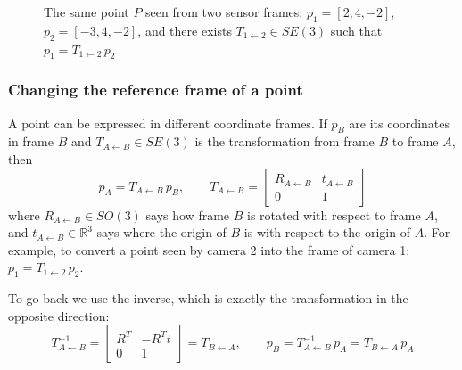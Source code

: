 \begin{figure}[H]
    \centering
    \caption{The same point $P$ seen from two sensor frames: $p_1 = [2, 4, -2]$, $p_2 = [-3, 4, -2]$, and there exists $T_{1\leftarrow2} \in SE(3)$ such that $p_1 = T_{1\leftarrow2}\,p_2$}
\end{figure}

\subsubsection{Changing the reference frame of a point}
A point can be expressed in different coordinate frames. If $p_B$ are its coordinates in frame $B$ and $T_{A\leftarrow B} \in SE(3)$ is the transformation from frame $B$ to frame $A$, then
\[
p_A = T_{A\leftarrow B}\, p_B, \qquad
T_{A\leftarrow B} = \begin{bmatrix} R_{A\leftarrow B} & t_{A\leftarrow B} \\ 0 & 1 \end{bmatrix}
\]
where $R_{A\leftarrow B} \in SO(3)$ says how frame $B$ is rotated with respect to frame $A$, and $t_{A\leftarrow B} \in \mathbb{R}^3$ says where the origin of $B$ is with respect to the origin of $A$.
For example, to convert a point seen by camera 2 into the frame of camera 1: $p_1 = T_{1\leftarrow2}\,p_2$.

To go back we use the inverse, which is exactly the transformation in the opposite direction:
\[
T_{A\leftarrow B}^{-1} = \begin{bmatrix} R^T & -R^T t \\ 0 & 1 \end{bmatrix} = T_{B\leftarrow A},
\qquad p_B = T_{A\leftarrow B}^{-1}\, p_A = T_{B\leftarrow A}\, p_A
\]

